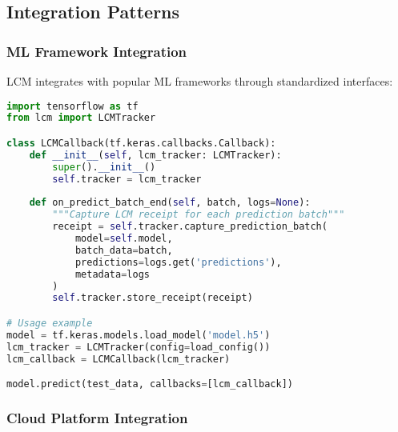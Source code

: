 \documentclass[12pt,a4paper]{article}
\begin{document}
\subsection{Integration Patterns}

\subsubsection{ML Framework Integration}

LCM integrates with popular ML frameworks through standardized interfaces:

\begin{lstlisting}[language=Python, caption=TensorFlow Integration Example]
import tensorflow as tf
from lcm import LCMTracker

class LCMCallback(tf.keras.callbacks.Callback):
    def __init__(self, lcm_tracker: LCMTracker):
        super().__init__()
        self.tracker = lcm_tracker
    
    def on_predict_batch_end(self, batch, logs=None):
        """Capture LCM receipt for each prediction batch"""
        receipt = self.tracker.capture_prediction_batch(
            model=self.model,
            batch_data=batch,
            predictions=logs.get('predictions'),
            metadata=logs
        )
        self.tracker.store_receipt(receipt)

# Usage example
model = tf.keras.models.load_model('model.h5')
lcm_tracker = LCMTracker(config=load_config())
lcm_callback = LCMCallback(lcm_tracker)

model.predict(test_data, callbacks=[lcm_callback])
\end{lstlisting}

\subsubsection{Cloud Platform Integration}
\end{document}
